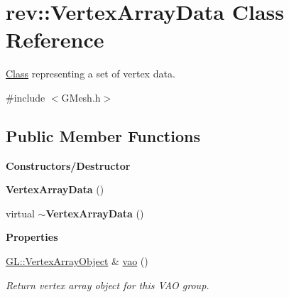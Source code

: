 \hypertarget{classrev_1_1_vertex_array_data}{}\section{rev\+::Vertex\+Array\+Data Class Reference}
\label{classrev_1_1_vertex_array_data}


\mbox{\hyperlink{struct_class}{Class}} representing a set of vertex data.  




{\ttfamily \#include $<$G\+Mesh.\+h$>$}

\subsection*{Public Member Functions}
\begin{Indent}\textbf{ Constructors/\+Destructor}\par
\begin{DoxyCompactItemize}
\item 
\mbox{\label{classrev_1_1_vertex_array_data_a288a221f31343f38c8b7d9e30c8da1fa}} 
{\bfseries Vertex\+Array\+Data} ()
\item 
\mbox{\label{classrev_1_1_vertex_array_data_a6888f7e7af5138c48b3d366c6c1a10e4}} 
virtual {\bfseries $\sim$\+Vertex\+Array\+Data} ()
\end{DoxyCompactItemize}
\end{Indent}
\begin{Indent}\textbf{ Properties}\par
\begin{DoxyCompactItemize}
\item 
\mbox{\label{classrev_1_1_vertex_array_data_a9395541036c9d6eb90fd987d535ca600}} 
\mbox{\hyperlink{classrev_1_1_g_l_1_1_vertex_array_object}{G\+L\+::\+Vertex\+Array\+Object}} \& \mbox{\hyperlink{classrev_1_1_vertex_array_data_a9395541036c9d6eb90fd987d535ca600}{vao}} ()
\begin{DoxyCompactList}\small\item\em Return vertex array object for this V\+AO group. \end{DoxyCompactList}\end{DoxyCompactItemize}
\end{Indent}
